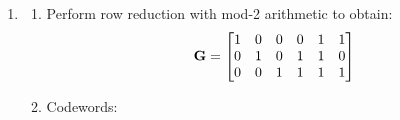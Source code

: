 \documentclass[12pt, a4paper]{article}
\begin{document}
\begin{enumerate}
  \pagebreak
  \item 
    \begin{enumerate}
      \item Perform row reduction with mod-2 arithmetic to obtain:
        \begin{align*}
          \mathbf{G} = \begin{bmatrix}
            1 & 0 & 0 & 0 & 1 & 1\\ 
            0 & 1 & 0 & 1 & 1 & 0\\ 
            0 & 0 & 1 & 1 & 1 & 1
          \end{bmatrix}
        \end{align*}

      \item Codewords:\\
    \end{enumerate}
    
\end{enumerate}
\end{document}
